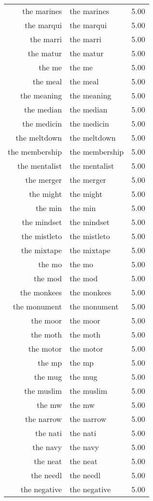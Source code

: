 \begin{table}[ht]
\begin{tabular}{rlr}
  the marines & the marines & 5.00 \\ 
  the marqui & the marqui & 5.00 \\ 
  the marri & the marri & 5.00 \\ 
  the matur & the matur & 5.00 \\ 
  the me & the me & 5.00 \\ 
  the meal & the meal & 5.00 \\ 
  the meaning & the meaning & 5.00 \\ 
  the median & the median & 5.00 \\ 
  the medicin & the medicin & 5.00 \\ 
  the meltdown & the meltdown & 5.00 \\ 
  the membership & the membership & 5.00 \\ 
  the mentalist & the mentalist & 5.00 \\ 
  the merger & the merger & 5.00 \\ 
  the might & the might & 5.00 \\ 
  the min & the min & 5.00 \\ 
  the mindset & the mindset & 5.00 \\ 
  the mistleto & the mistleto & 5.00 \\ 
  the mixtape & the mixtape & 5.00 \\ 
  the mo & the mo & 5.00 \\ 
  the mod & the mod & 5.00 \\ 
  the monkees & the monkees & 5.00 \\ 
  the monument & the monument & 5.00 \\ 
  the moor & the moor & 5.00 \\ 
  the moth & the moth & 5.00 \\ 
  the motor & the motor & 5.00 \\ 
  the mp & the mp & 5.00 \\ 
  the mug & the mug & 5.00 \\ 
  the muslim & the muslim & 5.00 \\ 
  the mw & the mw & 5.00 \\ 
  the narrow & the narrow & 5.00 \\ 
  the nati & the nati & 5.00 \\ 
  the navy & the navy & 5.00 \\ 
  the neat & the neat & 5.00 \\ 
  the needl & the needl & 5.00 \\ 
  the negative & the negative & 5.00 \\ 

\end{tabular}
\end{table}
